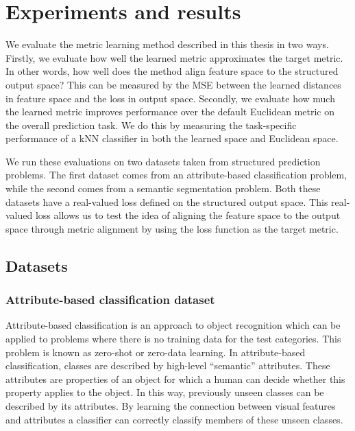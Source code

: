 \chapter{Experiments and results}

We evaluate the metric learning method described in this thesis in two ways. Firstly, we evaluate how well the learned metric approximates the target metric. In other words, how well does the method align feature space to the structured output space? This can be measured by the \acf{MSE} between the learned distances in feature space and the loss in output space. Secondly, we evaluate how much the learned metric improves performance over the default Euclidean metric on the overall prediction task. We do this by measuring the task-specific performance of a \ac{kNN} classifier in both the learned space and Euclidean space.

We run these evaluations on two datasets taken from structured prediction problems. The first dataset comes from an attribute-based classification problem, while the second comes from a semantic segmentation problem. Both these datasets have a real-valued loss defined on the structured output space. This real-valued loss allows us to test the idea of aligning the feature space to the output space through metric alignment by using the loss function as the target metric.



\section{Datasets}


\subsection{Attribute-based classification dataset}

Attribute-based classification is an approach to object recognition which can be applied to problems where there is no training data for the test categories. This problem is known as zero-shot or zero-data learning. In attribute-based classification, classes are described by high-level ``semantic'' attributes. These attributes are properties of an object for which a human can decide whether this property applies to the object. In this way, previously unseen classes can be described by its attributes. By learning the connection between visual features and attributes a classifier can correctly classify members of these unseen classes. 

